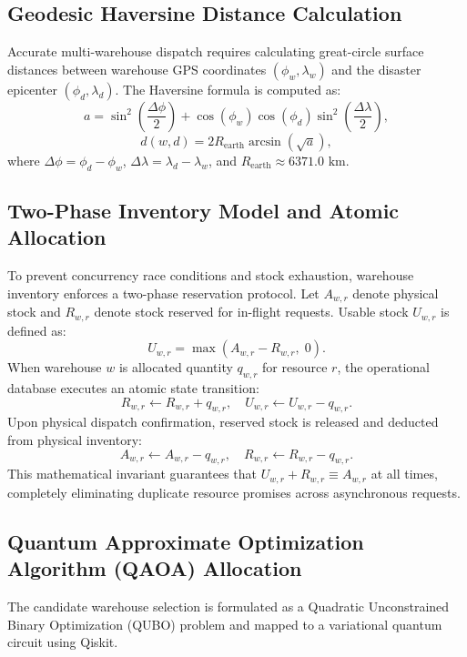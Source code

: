 \documentclass[conference]{IEEEtran}
\begin{document}
\subsection{Geodesic Haversine Distance Calculation}
Accurate multi-warehouse dispatch requires calculating great-circle surface distances between warehouse GPS coordinates $(\phi_w, \lambda_w)$ and the disaster epicenter $(\phi_d, \lambda_d)$. The Haversine formula is computed as:
\begin{equation}
a = \sin^2\left(\frac{\Delta \phi}{2}\right) + \cos(\phi_w)\cos(\phi_d)\sin^2\left(\frac{\Delta \lambda}{2}\right),
\label{eq:haversine_a}
\end{equation}
\begin{equation}
d(w, d) = 2 R_{\text{earth}} \arcsin\left(\sqrt{a}\right),
\label{eq:haversine_d}
\end{equation}
where $\Delta \phi = \phi_d - \phi_w$, $\Delta \lambda = \lambda_d - \lambda_w$, and $R_{\text{earth}} \approx 6371.0\text{ km}$.

\subsection{Two-Phase Inventory Model and Atomic Allocation}
To prevent concurrency race conditions and stock exhaustion, warehouse inventory enforces a two-phase reservation protocol. Let $A_{w,r}$ denote physical stock and $R_{w,r}$ denote stock reserved for in-flight requests. Usable stock $U_{w,r}$ is defined as:
\begin{equation}
U_{w,r} = \max(A_{w,r} - R_{w,r}, \; 0).
\label{eq:usable_stock}
\end{equation}
When warehouse $w$ is allocated quantity $q_{w,r}$ for resource $r$, the operational database executes an atomic state transition:
\begin{equation}
R_{w,r} \leftarrow R_{w,r} + q_{w,r}, \quad U_{w,r} \leftarrow U_{w,r} - q_{w,r}.
\label{eq:reserve_tx}
\end{equation}
Upon physical dispatch confirmation, reserved stock is released and deducted from physical inventory:
\begin{equation}
A_{w,r} \leftarrow A_{w,r} - q_{w,r}, \quad R_{w,r} \leftarrow R_{w,r} - q_{w,r}.
\label{eq:dispatch_tx}
\end{equation}
This mathematical invariant guarantees that $U_{w,r} + R_{w,r} \equiv A_{w,r}$ at all times, completely eliminating duplicate resource promises across asynchronous requests.

\subsection{Quantum Approximate Optimization Algorithm (QAOA) Allocation}
The candidate warehouse selection is formulated as a Quadratic Unconstrained Binary Optimization (QUBO) problem and mapped to a variational quantum circuit using Qiskit.
\end{document}
